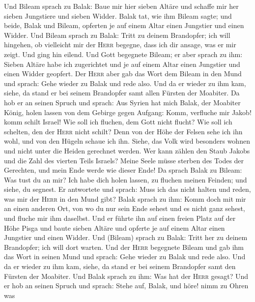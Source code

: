  Und Bileam sprach zu Balak: Baue mir hier sieben Altäre
und schaffe mir her sieben Jungstiere und sieben Widder. 
Balak tat, wie ihm Bileam sagte; und beide, Balak und Bileam, opferten
je auf einem Altar einen Jungstier und einen Widder.  Und
Bileam sprach zu Balak: Tritt zu deinem Brandopfer; ich will hingehen,
ob vielleicht mir der \textsc{Herr} begegne, dass ich dir ansage, was er
mir zeigt. Und ging hin eilend.  Und Gott begegnete
Bileam; er aber sprach zu ihm: Sieben Altäre habe ich zugerichtet und je
auf einem Altar einen Jungstier und einen Widder geopfert.
 Der \textsc{Herr} aber gab das Wort dem Bileam in den
Mund und sprach: Gehe wieder zu Balak und rede also.  Und
da er wieder zu ihm kam, siehe, da stand er bei seinem Brandopfer samt
allen Fürsten der Moabiter.  Da hob er an seinen Spruch
und sprach: Aus Syrien hat mich Balak, der Moabiter König, holen lassen
von dem Gebirge gegen Aufgang: Komm, verfluche mir Jakob! komm schilt
Israel!  Wie soll ich fluchen, dem Gott nicht flucht? Wie
soll ich schelten, den der \textsc{Herr} nicht schilt? 
Denn von der Höhe der Felsen sehe ich ihn wohl, und von den Hügeln
schaue ich ihn. Siehe, das Volk wird besonders wohnen und nicht unter
die Heiden gerechnet werden.  Wer kann zählen den Staub
Jakobs und die Zahl des vierten Teils Israels? Meine Seele müsse sterben
des Todes der Gerechten, und mein Ende werde wie dieser Ende!
 Da sprach Balak zu Bileam: Was tust du an mir? Ich habe
dich holen lassen, zu fluchen meinen Feinden; und siehe, du segnest.
 Er antwortete und sprach: Muss ich das nicht halten und
reden, was mir der \textsc{Herr} in den Mund gibt?  Balak
sprach zu ihm: Komm doch mit mir an einen anderen Ort, von wo du nur
sein Ende sehest und es nicht ganz sehest, und fluche mir ihm daselbst.
 Und er führte ihn auf einen freien Platz auf der Höhe
Pisga und baute sieben Altäre und opferte je auf einem Altar einen
Jungstier und einen Widder.  Und (Bileam) sprach zu
Balak: Tritt her zu deinem Brandopfer; ich will dort warten.
 Und der \textsc{Herr} begegnete Bileam und gab ihm das
Wort in seinen Mund und sprach: Gehe wieder zu Balak und rede also.
 Und da er wieder zu ihm kam, siehe, da stand er bei
seinem Brandopfer samt den Fürsten der Moabiter. Und Balak sprach zu
ihm: Was hat der \textsc{Herr} gesagt?  Und er hob an
seinen Spruch und sprach: Stehe auf, Balak, und höre! nimm zu Ohren was
